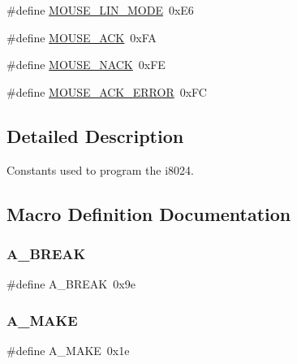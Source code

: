 \begin{DoxyCompactItemize}
$$\item 
\#define \mbox{\hyperlink{group__i8042_ga920b10c521570fb6514938b590d7ebc7}{M\+O\+U\+S\+E\+\_\+\+L\+I\+N\+\_\+\+M\+O\+DE}}~0x\+E6
\item 
\#define \mbox{\hyperlink{group__i8042_ga064ec583ce5b039303686ce4c64b4f3e}{M\+O\+U\+S\+E\+\_\+\+A\+CK}}~0x\+FA
\item 
\#define \mbox{\hyperlink{group__i8042_gaef4a299dedf83b6dc4765baab230affd}{M\+O\+U\+S\+E\+\_\+\+N\+A\+CK}}~0x\+FE
\item 
\#define \mbox{\hyperlink{group__i8042_gaba84d09c4308a2592cbfd274fbe8e5fe}{M\+O\+U\+S\+E\+\_\+\+A\+C\+K\+\_\+\+E\+R\+R\+OR}}~0x\+FC
\end{DoxyCompactItemize}


\subsection{Detailed Description}
Constants used to program the i8024. 

\subsection{Macro Definition Documentation}
\mbox{\label{group__i8042_ga05826112c5acf959ee58dcacd8e9d065}} 
\subsubsection{\texorpdfstring{A\+\_\+\+B\+R\+E\+AK}{A\_BREAK}}
{\footnotesize\ttfamily \#define A\+\_\+\+B\+R\+E\+AK~0x9e}

\mbox{\label{group__i8042_ga0f76fe84c649e8cf3a4114d0d9bf085a}} 
\subsubsection{\texorpdfstring{A\+\_\+\+M\+A\+KE}{A\_MAKE}}
{\footnotesize\ttfamily \#define A\+\_\+\+M\+A\+KE~0x1e}

\mbox{\label{group__i8042_ga1543601651318564477a7d4d44ef417f}} 
